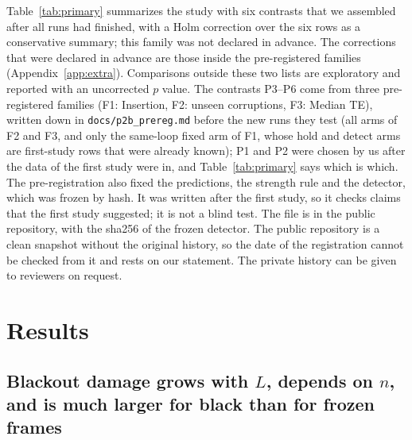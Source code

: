 \documentclass[11pt]{article}
\newcommand{\fixed}{\textsf{fixed}\xspace}
\newcommand{\detect}{\textsf{detect}\xspace}
\begin{document}
Table~\ref{tab:primary} summarizes the study with six contrasts that we assembled after all runs had finished, with a Holm correction over the six rows as a conservative summary; this family was not declared in advance. The corrections that were declared in advance are those inside the pre-registered families (Appendix~\ref{app:extra}). Comparisons outside these two lists are exploratory and reported with an uncorrected $p$ value. The contrasts P3--P6 come from three pre-registered families (F1: Insertion, F2: unseen corruptions, F3: Median TE), written down in \texttt{docs/p2b\_prereg.md} before the new runs they test (all arms of F2 and F3, and only the same-loop \fixed arm of F1, whose hold and \detect arms are first-study rows that were already known); P1 and P2 were chosen by us after the data of the first study were in, and Table~\ref{tab:primary} says which is which. The pre-registration also fixed the predictions, the strength rule and the detector, which was frozen by hash. It was written after the first study, so it checks claims that the first study suggested; it is not a blind test. The file is in the public repository, with the sha256 of the frozen detector. The public repository is a clean snapshot without the original history, so the date of the registration cannot be checked from it and rests on our statement. The private history can be given to reviewers on request.

\begin{table}[t]
\centering\small

\caption{Six summary contrasts, assembled after all runs. $x/y$: seeds where only the first-named rule succeeds / only the second does. Two-sided exact McNemar test; Holm correction over the six rows, a family that was not declared in advance. TC: Transfer Cube. P1, P2 are not pre-registered. P3--P6 are in pre-registered families F1--F3 (see text for which arms predate the pre-registration).}
\label{tab:primary}
\end{table}

\section{Results}
\label{sec:results}

\subsection{Blackout damage grows with $L$, depends on $n$, and is much larger for black than for frozen frames}
\label{sec:res-grid}
\end{document}
